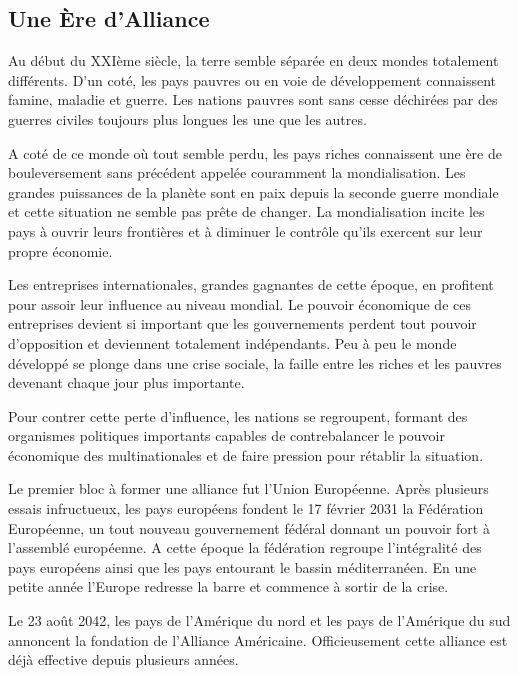 \begin{multicols}{2}

\section{Une Ère d’Alliance}

Au début du XXIème siècle, la terre semble séparée en deux mondes totalement différents. D’un coté, les pays pauvres ou en voie de développement connaissent famine, maladie et guerre. Les nations pauvres sont sans cesse déchirées par des guerres civiles toujours plus longues les une que les autres.

A coté de ce monde où tout semble perdu, les pays riches connaissent une ère de bouleversement sans précédent appelée couramment la mondialisation. Les grandes puissances de la planète sont en paix depuis la seconde guerre mondiale et cette situation ne semble pas prête de changer. La mondialisation incite les pays à ouvrir leurs frontières et à diminuer le contrôle qu’ils exercent sur leur propre économie.

Les entreprises internationales, grandes gagnantes de cette époque, en profitent pour assoir leur influence au niveau mondial. Le pouvoir économique de ces entreprises devient si important que les gouvernements perdent tout pouvoir d’opposition et deviennent totalement indépendants. Peu à peu le monde développé se plonge dans une crise sociale, la faille entre les riches et les pauvres devenant chaque jour plus importante.

Pour contrer cette perte d’influence, les nations se regroupent, formant des organismes politiques importants capables de contrebalancer le pouvoir économique des multinationales et de faire pression pour rétablir la situation. 

Le premier bloc à former une alliance fut l’Union Européenne. Après plusieurs essais infructueux, les pays européens fondent le 17 février 2031 la Fédération Européenne, un tout nouveau gouvernement fédéral donnant un pouvoir fort à l’assemblé européenne. A cette époque la fédération regroupe l’intégralité des pays européens ainsi que les pays entourant le bassin méditerranéen. En une petite année l’Europe redresse la barre et commence à sortir de la crise. 

Le 23 août 2042, les pays de l’Amérique du nord et les pays de l’Amérique du sud annoncent la fondation de l’Alliance Américaine. Officieusement cette alliance est déjà effective depuis plusieurs années. 


\end{multicols}
